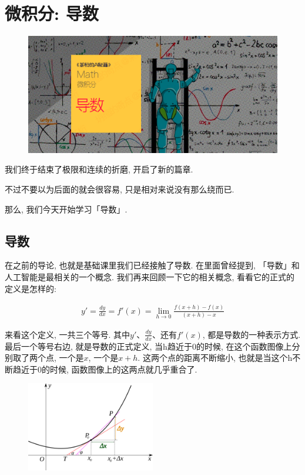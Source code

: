 \chapter{微积分: 导数}

\begin{figure}[ht]
  \centering
  \includegraphics[width=1\textwidth]{asset/茶桁的AI秘籍_Math_9.png}
\end{figure}

\newpage

我们终于结束了极限和连续的折磨, 开启了新的篇章. 

不过不要以为后面的就会很容易, 只是相对来说没有那么绕而已. 

那么, 我们今天开始学习「导数」. 

\section{导数}

在之前的导论, 也就是基础课里我们已经接触了导数. 在里面曾经提到, 「导数」和人工智能是最相关的一个概念. 我们再来回顾一下它的相关概念, 看看它的正式的定义是怎样的: 

\begin{align*}
  y' = \frac{dy}{dx} = f'(x) = \lim_{h \to 0} \frac{f(x+h) - f(x)}{(x+h) - x}
\end{align*}

来看这个定义, 一共三个等号. 其中$y'$、$\frac{dy}{dx}$、还有$f'(x)$, 都是导数的一种表示方式. 最后一个等号右边, 就是导数的正式定义, 当h趋近于0的时候, 在这个函数图像上分别取了两个点, 一个是$x$, 一个是$x+h$. 这两个点的距离不断缩小, 也就是当这个h不断趋近于0的时候, 函数图像上的这两点就几乎重合了. 

\begin{figure}[ht]
  \centering
  \includegraphics[width=0.5\textwidth]{asset/d46aa419-f50b-4bfd-83eb-d807f3c821a0.png}
  \caption{}
  \label{fig:img10_1}
\end{figure}

